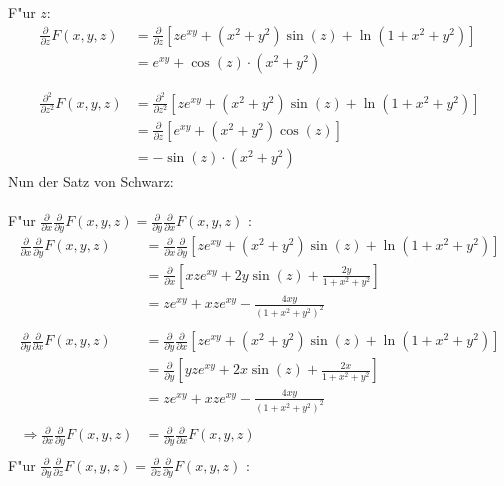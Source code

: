 \documentclass{theozettel}
\begin{document}
F"ur $z$:\\
\begin{align*}
\frac{\partial}{\partial z}F\left(x,y,z\right) &=\frac{\partial}{\partial z}\left[ze^{xy}+\left(x^2+y^2\right)\sin\left(z\right)+\ln\left(1+x^2+y^2\right)\right]\\
&=e^{xy}+\cos\left(z\right)\cdot\left(x^2+y^2\right)\\\\\\
\frac{\partial^2}{\partial z^2}F\left(x,y,z\right) &=\frac{\partial^2}{\partial z^2}\left[ze^{xy}+\left(x^2+y^2\right)\sin\left(z\right)+\ln\left(1+x^2+y^2\right)\right]\\
&=\frac{\partial}{\partial z}\left[e^{xy}+\left(x^2+y^2\right)\cos\left(z\right)\right]\\
&= -\sin\left(z\right) \cdot \left(x^2+y^2\right)
\end{align*}
Nun der Satz von Schwarz:\\\\
F"ur $\frac{\partial}{\partial x}\frac{\partial}{\partial y}F\left(x,y,z\right) =\frac{\partial}{\partial y}\frac{\partial}{\partial x}F\left(x,y,z\right)$ :
\begin{align*}
\frac{\partial}{\partial x}\frac{\partial}{\partial y}F\left(x,y,z\right) &= \frac{\partial}{\partial x}\frac{\partial}{\partial y}\left[ze^{xy}+\left(x^2+y^2\right)\sin\left(z\right)+\ln\left(1+x^2+y^2\right)\right]\\
&=\frac{\partial}{\partial x}\left[xze^{xy}+2y\sin\left(z\right)+\frac{2y}{1+x^2+y^2}\right]\\
&= ze^{xy}+xze^{xy}-\frac{4xy}{\left(1+x^2+y^2\right)^2}\\\\
\frac{\partial}{\partial y}\frac{\partial}{\partial x}F\left(x,y,z\right) &= \frac{\partial}{\partial y}\frac{\partial}{\partial x}\left[ze^{xy}+\left(x^2+y^2\right)\sin\left(z\right)+\ln\left(1+x^2+y^2\right)\right]\\
&= \frac{\partial}{\partial y}\left[yze^{xy}+2x\sin\left(z\right)+\frac{2x}{1+x^2+y^2}\right]\\
&= ze^{xy}+xze^{xy}-\frac{4xy}{\left(1+x^2+y^2\right)^2}\\\\
\Rightarrow \frac{\partial}{\partial x}\frac{\partial}{\partial y}F\left(x,y,z\right) &=\frac{\partial}{\partial y}\frac{\partial}{\partial x}F\left(x,y,z\right)\\
\end{align*}
F"ur $\frac{\partial}{\partial y}\frac{\partial}{\partial z}F\left(x,y,z\right) =\frac{\partial}{\partial z}\frac{\partial}{\partial y}F\left(x,y,z\right)$ :
\end{document}
